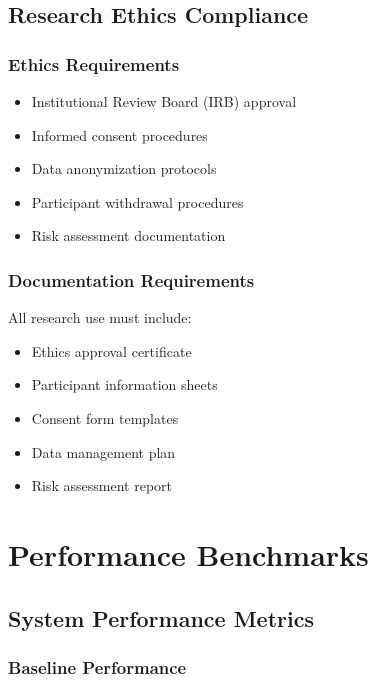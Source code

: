 \subsection{Research Ethics Compliance}

\subsubsection{Ethics Requirements}

\begin{itemize}
\item Institutional Review Board (IRB) approval
\item Informed consent procedures
\item Data anonymization protocols
\item Participant withdrawal procedures
\item Risk assessment documentation
\end{itemize}

\subsubsection{Documentation Requirements}

All research use must include:
\begin{itemize}
\item Ethics approval certificate
\item Participant information sheets
\item Consent form templates
\item Data management plan
\item Risk assessment report
\end{itemize}

\section{Performance Benchmarks}

\subsection{System Performance Metrics}

\subsubsection{Baseline Performance}

